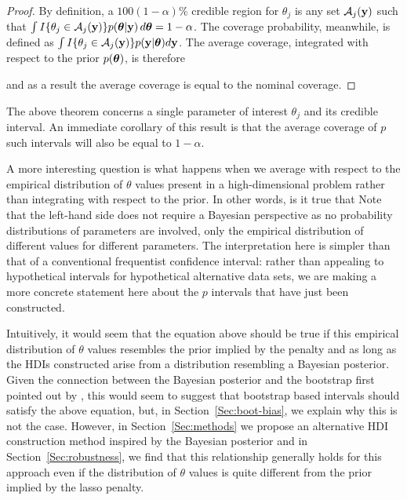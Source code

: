 \begin{proof}
  By definition, a $100(1-\alpha)\%$ credible region for $\theta_j$ is any set $\mathcal{A}_j(\mathbf{y})$ such that $\int I\{\theta_j \in \mathcal{A}_j(\mathbf{y})\} p(\boldsymbol{\theta}|\mathbf{y})\,d\boldsymbol{\theta} = 1 - \alpha$. The coverage probability, meanwhile, is defined as $\int I\{\theta_j \in \mathcal{A}_j(\mathbf{y})\} p(\mathbf{y} | \boldsymbol{\theta})d\mathbf{y}$. The average coverage, integrated with respect to the prior $p(\boldsymbol{\theta})$, is therefore


  \noindent and as a result the average coverage is equal to the nominal coverage.
\end{proof}

The above theorem concerns a single parameter of interest $\theta_j$ and its credible interval. An immediate corollary of this result is that the average coverage of $p$ such intervals will also be equal to $1-\alpha$.

A more interesting question is what happens when we average with respect to the empirical distribution of $\theta$ values present in a high-dimensional problem rather than integrating with respect to the prior. In other words, is it true that
Note that the left-hand side does not require a Bayesian perspective as no probability distributions of parameters are involved, only the empirical distribution of different values for different parameters. The interpretation here is simpler than that of a conventional frequentist confidence interval: rather than appealing to hypothetical intervals for hypothetical alternative data sets, we are making a more concrete statement here about the $p$ intervals that have just been constructed.

Intuitively, it would seem that the equation above should be true if this empirical distribution of $\theta$ values resembles the prior implied by the penalty and as long as the HDIs constructed arise from a distribution resembling a Bayesian posterior. Given the connection between the Bayesian posterior and the bootstrap first pointed out by \cite{Rubin1981}, this would seem to suggest that bootstrap based intervals should satisfy the above equation, but, in Section~\ref{Sec:boot-bias}, we explain why this is not the case. However, in Section~\ref{Sec:methods} we propose an alternative HDI construction method inspired by the Bayesian posterior and in Section~\ref{Sec:robustness}, we find that this relationship generally holds for this approach even if the distribution of $\theta$ values is quite different from the prior implied by the lasso penalty.

